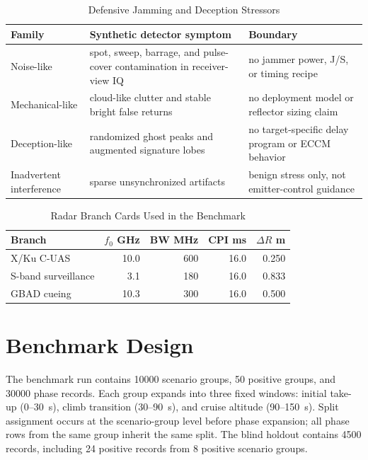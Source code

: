 \documentclass[10pt,journal]{IEEEtran}
\newcommand{\MetricScenarioGroups}{10000}
\newcommand{\MetricPositiveGroups}{50}
\newcommand{\MetricPhaseRecords}{30000}
\newcommand{\MetricHoldoutRecords}{4500}
\newcommand{\MetricHoldoutPositiveRecords}{24}
\newcommand{\MetricHoldoutPositiveGroups}{8}
\begin{document}
\begin{table}[t]
  \caption{Defensive Jamming and Deception Stressors}
  \label{tab:jammingdeception}
  \centering
  \small
  \begin{tabularx}{\columnwidth}{@{}p{}YY@{}}
    \toprule
    Family & Synthetic detector symptom & Boundary \\
    \midrule
    Noise-like & spot, sweep, barrage, and pulse-cover contamination in receiver-view IQ & no jammer power, J/S, or timing recipe \\
    Mechanical-like & cloud-like clutter and stable bright false returns & no deployment model or reflector sizing claim \\
    Deception-like & randomized ghost peaks and augmented signature lobes & no target-specific delay program or ECCM behavior \\
    Inadvertent interference & sparse unsynchronized artifacts & benign stress only, not emitter-control guidance \\
    \bottomrule
  \end{tabularx}
\end{table}

\begin{table}[t]
  \caption{Radar Branch Cards Used in the Benchmark}
  \label{tab:radarbranches}
  \centering
  \small
  \begin{tabular}{@{}lrrrr@{}}
    \toprule
    Branch & $f_0$ GHz & BW MHz & CPI ms & $\Delta R$ m \\
    \midrule
    X/Ku C-UAS & 10.0 & 600 & 16.0 & 0.250 \\
    S-band surveillance & 3.1 & 180 & 16.0 & 0.833 \\
    GBAD cueing & 10.3 & 300 & 16.0 & 0.500 \\
    \bottomrule
  \end{tabular}
\end{table}

\section{Benchmark Design}
The benchmark run contains \MetricScenarioGroups{} scenario groups, \MetricPositiveGroups{} positive groups, and \MetricPhaseRecords{} phase records. Each group expands into three fixed windows: initial take-up (0--30~s), climb transition (30--90~s), and cruise altitude (90--150~s). Split assignment occurs at the scenario-group level before phase expansion; all phase rows from the same group inherit the same split. The blind holdout contains \MetricHoldoutRecords{} records, including \MetricHoldoutPositiveRecords{} positive records from \MetricHoldoutPositiveGroups{} positive scenario groups.
\end{document}
